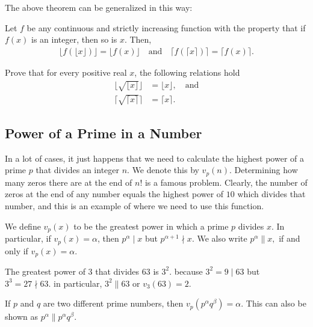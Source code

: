 \documentclass[12pt]{subfile}
\begin{document}
The above theorem can be generalized in this way:
\begin{theorem}
	Let $f$ be any continuous and strictly increasing function with the property that if $f(x)$ is an integer, then so is $x$. Then,
	\begin{align*}
	\bigg\lfloor f(\lfloor x \rfloor)\bigg\rfloor  = \bigg\lfloor f(x) \bigg\rfloor \quad \text{and} \quad \bigg\lceil f(\lceil x \rceil)\bigg\rceil  = \bigg\lceil f(x) \bigg\rceil.
	\end{align*}
\end{theorem}

\begin{problem}
	Prove that for every positive real $x$, the following relations hold
		\begin{align*}
		\big\lfloor \sqrt {\lfloor x \rfloor} \big\rfloor &= \lfloor x \rfloor, \quad \text{and}\\
		\big\lceil \sqrt{ \lceil x \rceil} \big\rceil &= \lceil x \rceil.
		\end{align*}
\end{problem}




\subsection{Power of a Prime in a Number} \label{sec:powerofprimes}
In a lot of cases, it just happens that we need to calculate the highest power of a prime $p$ that divides an integer $n$. We denote this by $v_p(n)$. Determining how many zeros there are at the end of $n!$ is a famous problem. Clearly, the number of zeros at the end of any number equals the highest power of $10$ which divides that number, and this is an example of where we need to use this function.

\begin{definition}\label{def:vp}
	We define $v_p(x)$ to be the greatest power in which a prime $p$ divides $x$. In particular, if $v_p(x)=\alpha$, then $p^{\alpha} \mid x$ but $p^{\alpha+1} \nmid x$. We also write $p^{\alpha} \|  x, $ if and only if $v_p(x) = \alpha$.
\end{definition}

\begin{example}
	The greatest power of $3$ that divides $63$ is $3^2.$ because $3^2=9 \mid 63$ but $3^3 =27 \nmid 63.$
	in particular, $ 3^2 \|  63$ or $v_3(63)=2.$
\end{example}

\begin{example}
	If $p$ and $q$ are two different prime numbers, then $ v_p( p^ \alpha q^ \beta) = \alpha$. This can also be shown as $p^\alpha \|  p^ \alpha q^ \beta$.
\end{example}
\end{document}
